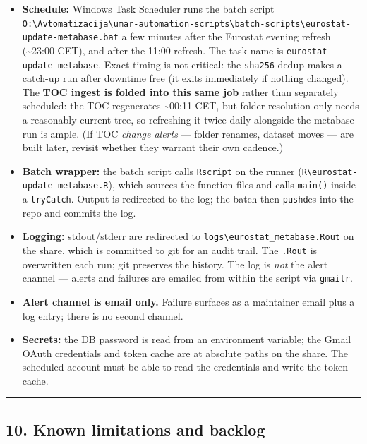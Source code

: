 \documentclass[
]{article}
\providecommand{\tightlist}{%
  \setlength{\itemsep}{0pt}\setlength{\parskip}{0pt}}
\begin{document}
\begin{itemize}
\tightlist
\item
  \textbf{Schedule:} Windows Task Scheduler runs the batch script
  \texttt{O:\textbackslash{}Avtomatizacija\textbackslash{}umar-automation-scripts\textbackslash{}batch-scripts\textbackslash{}eurostat-update-metabase.bat}
  a few minutes after the Eurostat evening refresh (\textasciitilde23:00
  CET), and after the 11:00 refresh. The task name is
  \texttt{eurostat-update-metabase}. Exact timing is not critical: the
  \texttt{sha256} dedup makes a catch-up run after downtime free (it
  exits immediately if nothing changed). The \textbf{TOC ingest is
  folded into this same job} rather than separately scheduled: the TOC
  regenerates \textasciitilde00:11 CET, but folder resolution only needs
  a reasonably current tree, so refreshing it twice daily alongside the
  metabase run is ample. (If TOC \emph{change alerts} --- folder
  renames, dataset moves --- are built later, revisit whether they
  warrant their own cadence.)
\item
  \textbf{Batch wrapper:} the batch script calls \texttt{Rscript} on the
  runner (\texttt{R\textbackslash{}eurostat-update-metabase.R}), which
  sources the function files and calls \texttt{main()} inside a
  \texttt{tryCatch}. Output is redirected to the log; the batch then
  \texttt{pushd}es into the repo and commits the log.
\item
  \textbf{Logging:} stdout/stderr are redirected to
  \texttt{logs\textbackslash{}eurostat\_metabase.Rout} on the share,
  which is committed to git for an audit trail. The \texttt{.Rout} is
  overwritten each run; git preserves the history. The log is \emph{not}
  the alert channel --- alerts and failures are emailed from within the
  script via \texttt{gmailr}.
\item
  \textbf{Alert channel is email only.} Failure surfaces as a maintainer
  email plus a log entry; there is no second channel.
\item
  \textbf{Secrets:} the DB password is read from an environment
  variable; the Gmail OAuth credentials and token cache are at absolute
  paths on the share. The scheduled account must be able to read the
  credentials and write the token cache.
\end{itemize}

\begin{center}\rule{0.5\linewidth}{0.5pt}\end{center}

\subsection{10. Known limitations and
backlog}\label{known-limitations-and-backlog}
\end{document}
